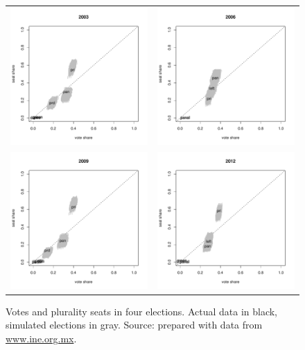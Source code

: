 \documentclass[letter,12pt]{article}
\begin{document}
\begin{figure}
\begin{center}
\begin{tabular}{cc}
    \includegraphics[width=.4\columnwidth]{vs2003.pdf} &
    \includegraphics[width=.4\columnwidth]{vs2006.pdf} \\
    \includegraphics[width=.4\columnwidth]{vs2009.pdf} &
    \includegraphics[width=.4\columnwidth]{vs2012.pdf} \\
\end{tabular}
\caption{Votes and plurality seats in four elections. Actual data in black, simulated elections in gray. Source: prepared with data from \url{www.ine.org.mx}.}\label{F:singleYrSeatsVotes}
\end{center}
\end{figure}
\end{document}
